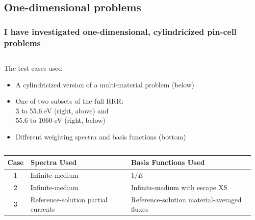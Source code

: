 \documentclass[compress,10pt]{beamer}
\begin{document}
\subsection{One-dimensional problems}

\typeout{***********************************************************************************}

\begin{frame}
    \frametitle{I have investigated one-dimensional, cylindricized pin-cell problems}

    \centering
    \begin{columns}[c]

        \centering

	\vspace{-1mm}

        \begin{block}{The test cases used}
            \begin{itemize}
            	\footnotesize
                \item A cylindricized version of a multi-material problem (below)
                \item One of two subsets of the full RRR: \\3 to 55.6 eV (right, above) and \\55.6 to 1060 eV (right, below)
                \item Different weighting spectra and basis functions (bottom)
            \end{itemize}
        \end{block}



        \centering


    \end{columns}

    { \tiny
        \begin{tabular}{cll}
        \hline
        Case & Spectra Used & Basis Functions Used \\ \hline
        \hline
        1 & Infinite-medium & $1/E$ \\ \hline
        2 & Infinite-medium & Infinite-medium with escape XS \\ \hline
        3 & Reference-solution partial currents & Reference-solution material-averaged fluxes \\ \hline
        \end{tabular}
    }

\end{frame}
\end{document}
